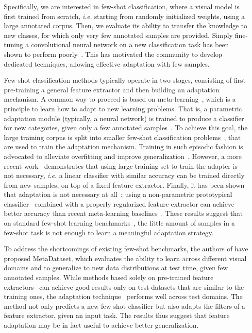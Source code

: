 \documentclass[runningheads]{llncs}
\begin{document}
Specifically, we are interested in few-shot classification, where a visual model
is first trained from scratch, \textit{i.e.} starting from randomly initialized weights,
using a large annotated corpus. Then, we evaluate its ability to transfer the
knowledge to new classes, for which only very few annotated samples are
provided. Simply fine-tuning a convolutional neural network on a new
classification task has been shown to perform poorly~\cite{finn2017model}. This
has motivated the community to develop dedicated techniques, allowing effective
adaptation with few samples.

Few-shot classification methods typically operate in two stages, consisting of 
first pre-training a general feature extractor and then building an adaptation
mechanism. A common way to proceed is
based on
meta-learning~\cite{finn2017model,ravioptimization,schmidhuber1997shifting,snell2017prototypical,thrun1998lifelong,vinyals2016matching},
which is a principle to learn how to adapt to new learning
problems. That is, a parametric adaptation module (typically, a neural network)
is trained to produce a classifier for new categories, given only a few
annotated samples~\cite{gidaris2018dynamic,qiao2018few,rusu2018meta}.
To achieve this goal, the large training corpus is split into smaller
few-shot classification
problems~\cite{finn2017model,ravioptimization,vinyals2016matching}, that are
used to train the adaptation mechanism. Training
in such episodic fashion is advocated to alleviate overfitting and
improve
generalization~\cite{finn2017model,ravioptimization,vinyals2016matching}.
However, a more recent work~\cite{chen19closerfewshot} demonstrates that using
large training set to train the adapter is not necessary, \textit{i.e.} a linear
classifier with similar accuracy can be trained directly from new samples, on
top of a fixed feature extractor. Finally, it has been shown that 
adaptation is not necessary at all~\cite{dvornik2019diversity}; using a
non-parametric prototypical classifier~\cite{mensink2013distance} combined with a
properly regularized feature extractor can achieve better
accuracy than recent meta-learning baselines~\cite{dvornik2019diversity,saikia2020optimized}. These results suggest
that on standard few-shot learning
benchmarks~\cite{ravioptimization,ren2018meta},
the little amount of samples in a few-shot task is not enough to learn a
meaningful adaptation strategy.

To address the shortcomings of existing few-shot benchmarks, the authors of
\cite{triantafillou2019meta} have proposed MetaDataset, which evaluates the
ability to learn across different visual domains and to generalize to new data
distributions at test time, given few annotated samples. While methods based
solely on pre-trained feature extractors~\cite{saikia2020optimized} can
achieve good results only on test datasets that are similar to the
training ones, the adaptation
technique~\cite{requeima2019fast} performs well across test domains. The
method not only predicts a new few-shot classifier but also adapts
the filters of a feature extractor, given an input task. The results thus
suggest that feature adaptation may be in fact useful to achieve better generalization.
\end{document}
